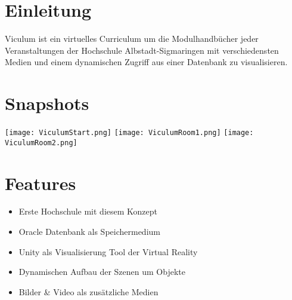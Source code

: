 \documentclass[a0,portrait]{a0poster}
\begin{document}
\begin{multicols}{2} %




\section*{\huge Einleitung}

\begin{doublespace}
{\LARGE Viculum ist ein virtuelles Curriculum um die Modulhandbücher jeder Veranstaltungen der Hochschule Albstadt-Sigmaringen mit verschiedensten Medien und einem dynamischen Zugriff aus einer Datenbank zu visualisieren.} 
\end{doublespace}



\section*{\huge Snapshots}
\begin{center}

\texttt{[image: ViculumStart.png]}
\texttt{[image: ViculumRoom1.png]}
\texttt{[image: ViculumRoom2.png]}

\end{center}

\color{Black} %

\section*{\huge Features}

\begin{doublespace}
\begin{itemize}
\item {\LARGE Erste Hochschule mit diesem Konzept}
\item {\LARGE Oracle Datenbank als Speichermedium}
\item {\LARGE Unity als Visualisierung Tool der Virtual Reality}
\item {\LARGE Dynamischen Aufbau der Szenen um Objekte}
\item {\LARGE Bilder \& Video als zusätzliche Medien}
\end{itemize}
\end{doublespace}


\end{multicols}
\end{document}
